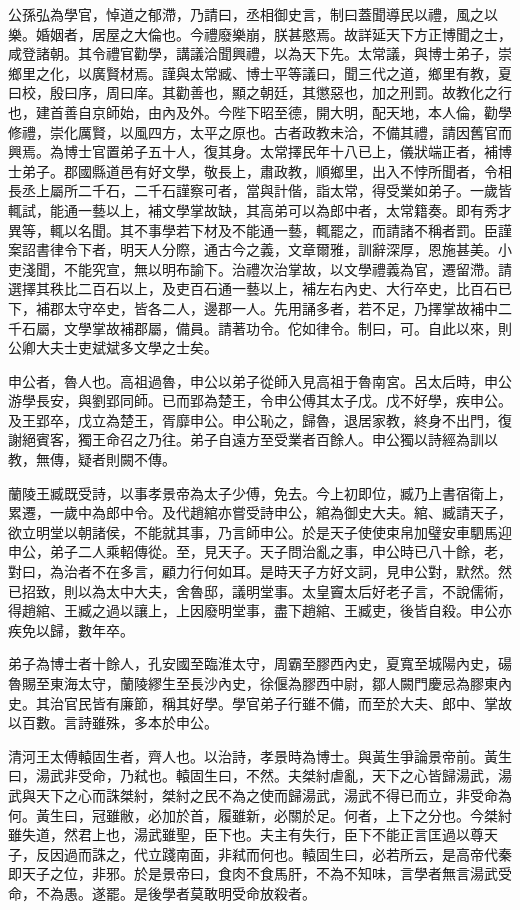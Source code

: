 公孫弘為學官，悼道之郁滯，乃請曰，丞相御史言，制曰蓋聞導民以禮，風之以樂。婚姻者，居屋之大倫也。今禮廢樂崩，朕甚愍焉。故詳延天下方正博聞之士，咸登諸朝。其令禮官勸學，講議洽聞興禮，以為天下先。太常議，與博士弟子，崇鄉里之化，以廣賢材焉。謹與太常臧、博士平等議曰，聞三代之道，鄉里有教，夏曰校，殷曰序，周曰庠。其勸善也，顯之朝廷，其懲惡也，加之刑罰。故教化之行也，建首善自京師始，由內及外。今陛下昭至德，開大明，配天地，本人倫，勸學修禮，崇化厲賢，以風四方，太平之原也。古者政教未洽，不備其禮，請因舊官而興焉。為博士官置弟子五十人，復其身。太常擇民年十八已上，儀狀端正者，補博士弟子。郡國縣道邑有好文學，敬長上，肅政教，順鄉里，出入不悖所聞者，令相長丞上屬所二千石，二千石謹察可者，當與計偕，詣太常，得受業如弟子。一歲皆輒試，能通一藝以上，補文學掌故缺，其高弟可以為郎中者，太常籍奏。即有秀才異等，輒以名聞。其不事學若下材及不能通一藝，輒罷之，而請諸不稱者罰。臣謹案詔書律令下者，明天人分際，通古今之義，文章爾雅，訓辭深厚，恩施甚美。小吏淺聞，不能究宣，無以明布諭下。治禮次治掌故，以文學禮義為官，遷留滯。請選擇其秩比二百石以上，及吏百石通一藝以上，補左右內史、大行卒史，比百石已下，補郡太守卒史，皆各二人，邊郡一人。先用誦多者，若不足，乃擇掌故補中二千石屬，文學掌故補郡屬，備員。請著功令。佗如律令。制曰，可。自此以來，則公卿大夫士吏斌斌多文學之士矣。

申公者，魯人也。高祖過魯，申公以弟子從師入見高祖于魯南宮。呂太后時，申公游學長安，與劉郢同師。已而郢為楚王，令申公傅其太子戊。戊不好學，疾申公。及王郢卒，戊立為楚王，胥靡申公。申公恥之，歸魯，退居家教，終身不出門，復謝絕賓客，獨王命召之乃往。弟子自遠方至受業者百餘人。申公獨以詩經為訓以教，無傳，疑者則闕不傳。

蘭陵王臧既受詩，以事孝景帝為太子少傅，免去。今上初即位，臧乃上書宿衛上，累遷，一歲中為郎中令。及代趙綰亦嘗受詩申公，綰為御史大夫。綰、臧請天子，欲立明堂以朝諸侯，不能就其事，乃言師申公。於是天子使使束帛加璧安車駟馬迎申公，弟子二人乘軺傳從。至，見天子。天子問治亂之事，申公時已八十餘，老，對曰，為治者不在多言，顧力行何如耳。是時天子方好文詞，見申公對，默然。然已招致，則以為太中大夫，舍魯邸，議明堂事。太皇竇太后好老子言，不說儒術，得趙綰、王臧之過以讓上，上因廢明堂事，盡下趙綰、王臧吏，後皆自殺。申公亦疾免以歸，數年卒。

弟子為博士者十餘人，孔安國至臨淮太守，周霸至膠西內史，夏寬至城陽內史，碭魯賜至東海太守，蘭陵繆生至長沙內史，徐偃為膠西中尉，鄒人闕門慶忌為膠東內史。其治官民皆有廉節，稱其好學。學官弟子行雖不備，而至於大夫、郎中、掌故以百數。言詩雖殊，多本於申公。

清河王太傅轅固生者，齊人也。以治詩，孝景時為博士。與黃生爭論景帝前。黃生曰，湯武非受命，乃弒也。轅固生曰，不然。夫桀紂虐亂，天下之心皆歸湯武，湯武與天下之心而誅桀紂，桀紂之民不為之使而歸湯武，湯武不得已而立，非受命為何。黃生曰，冠雖敝，必加於首，履雖新，必關於足。何者，上下之分也。今桀紂雖失道，然君上也，湯武雖聖，臣下也。夫主有失行，臣下不能正言匡過以尊天子，反因過而誅之，代立踐南面，非弒而何也。轅固生曰，必若所云，是高帝代秦即天子之位，非邪。於是景帝曰，食肉不食馬肝，不為不知味，言學者無言湯武受命，不為愚。遂罷。是後學者莫敢明受命放殺者。

